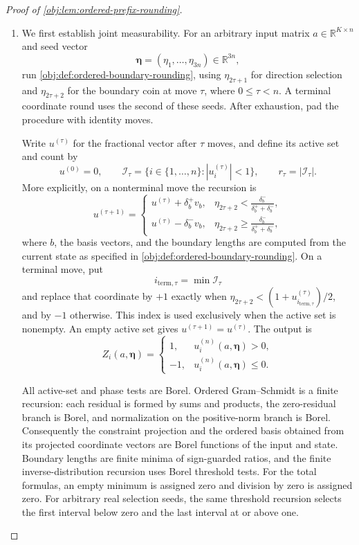 \begin{proof}[Proof of \cref{obj:lem:ordered-prefix-rounding}]
\begin{enumerate}
\item
We first establish joint measurability. For an arbitrary input matrix \(a\in\mathbb R^{K\times n}\) and seed vector
\[
\boldsymbol\eta=(\eta_1,\ldots,\eta_{3n})\in\mathbb R^{3n},
\]
run \cref{obj:def:ordered-boundary-rounding}, using \(\eta_{2\tau+1}\) for direction selection and \(\eta_{2\tau+2}\) for the boundary coin at move \(\tau\), where \(0\leq\tau<n\). A terminal coordinate round uses the second of these seeds. After exhaustion, pad the procedure with identity moves.

Write \(u^{(\tau)}\) for the fractional vector after \(\tau\) moves, and define its active set and count by
\[
u^{(0)}=0,\qquad
\mathcal I_\tau=\{i\in\{1,\ldots,n\}:|u_i^{(\tau)}|<1\},
\qquad
r_\tau=|\mathcal I_\tau|.
\]
More explicitly, on a nonterminal move the recursion is
\[
u^{(\tau+1)}
=
\begin{cases}
u^{(\tau)}+\delta_b^+v_b,
&\displaystyle \eta_{2\tau+2}<\frac{\delta_b^-}{\delta_b^++\delta_b^-},\\[4pt]
u^{(\tau)}-\delta_b^-v_b,
&\displaystyle \eta_{2\tau+2}\geq\frac{\delta_b^-}{\delta_b^++\delta_b^-},
\end{cases}
\]
where \(b\), the basis vectors, and the boundary lengths are computed from the current state as specified in \cref{obj:def:ordered-boundary-rounding}. On a terminal move, put
\[
i_{\mathrm{term},\tau}=\min\mathcal I_\tau
\]
and replace that coordinate by \(+1\) exactly when
\(\eta_{2\tau+2}<(1+u_{i_{\mathrm{term},\tau}}^{(\tau)})/2\), and by \(-1\) otherwise. This index is used exclusively when the active set is nonempty. An empty active set gives \(u^{(\tau+1)}=u^{(\tau)}\). The output is
\[
Z_i(a,\boldsymbol\eta)
=
\begin{cases}
1,&u_i^{(n)}(a,\boldsymbol\eta)>0,\\
-1,&u_i^{(n)}(a,\boldsymbol\eta)\leq0.
\end{cases}
\]

All active-set and phase tests are Borel. Ordered Gram--Schmidt is a finite recursion: each residual is formed by sums and products, the zero-residual branch is Borel, and normalization on the positive-norm branch is Borel. Consequently the constraint projection and the ordered basis obtained from its projected coordinate vectors are Borel functions of the input and state. Boundary lengths are finite minima of sign-guarded ratios, and the finite inverse-distribution recursion uses Borel threshold tests. For the total formulas, an empty minimum is assigned zero and division by zero is assigned zero. For arbitrary real selection seeds, the same threshold recursion selects the first interval below zero and the last interval at or above one.


\end{enumerate}
\end{proof}
